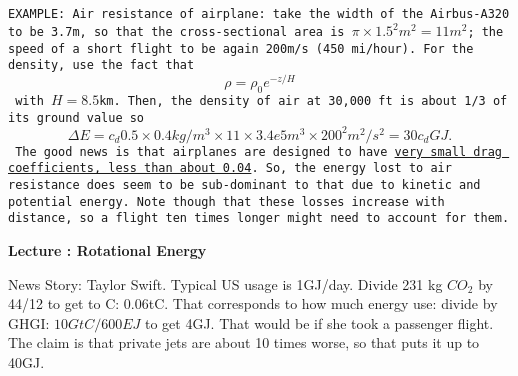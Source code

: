 \documentclass[11pt]{book}
\def\be{\begin{equation}}
\def\ee{\end{equation}}
\newcommand{\sfig}[2]{
\texttt{[image: \#1]}
        }
\newcommand{\Sfig}[2]{
   \begin{figure}[thbp]
   \begin{center}
    \sfig{../Figures/#1.pdf}{0.7\columnwidth}
    \caption{{\small #2}}
    \label{fig:#1}
     \end{center}
   \end{figure}
}
\newcommand\example[1]{{\tt EXAMPLE: #1}}
\newcommand\lecture[1]{\newpage
\addtocounter{lectureno}{1}
\setcounter{secno}{0}
\begin{center}
 {\bf Lecture \arabic{lectureno}: #1}
\end{center}
}
\newcounter{lectureno}
\newcounter{secno}
\begin{document}
\example{Air resistance of airplane: take the width of the Airbus-A320 to be 3.7m, so that the cross-sectional area is $\pi\times 1.5^2m^2=11m^2$; the speed of a short flight to be again 200m/s (450 mi/hour). For the density, use the fact that
\be
\rho = \rho_0e^{-z/H}\ee
with $H=8.5$km.
Then, the density of air at 30,000 ft is about 1/3 of its ground value so
\be
\Delta E = c_d 0.5\times 0.4kg/m^3 \times 11\times 3.4e5 m^3\times 200^2 m^2/s^2=30c_dGJ
.\ee
The good news is that airplanes are designed to have \href{https://www.semanticscholar.org/paper/Aircraft-Drag-Polar-Estimation-Based-on-a-Model-Sun-Hoekstra/38ee841fa4dcc353a0ce2345cdc6e7d498b14a4e/figure/15}{very small drag coefficients, less than about 0.04}. So, the energy lost to air resistance does seem to be sub-dominant to that due to kinetic and potential energy. Note though that these losses increase with distance, so a flight ten times longer might need to account for them.}

\lecture{Rotational Energy}

News Story: Taylor Swift. Typical US usage is 1GJ/day. Divide 231 kg $CO_2$ by 44/12 to get to C: 0.06tC. That corresponds to how much energy use: divide by GHGI: $10GtC/600EJ$ to get  4GJ. That would be if she took a passenger flight. The claim is that private jets are about 10 times worse, so that puts it up to 40GJ. 
\end{document}
